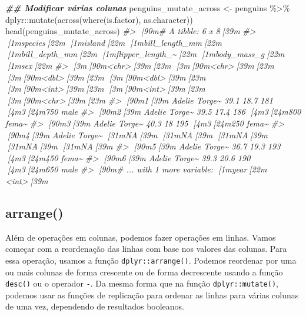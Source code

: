 \documentclass[
]{book}
\newenvironment{Shaded}{\begin{snugshade}}{\end{snugshade}}
\newcommand{\CommentTok}[1]{\textcolor[rgb]{0.37,0.37,0.37}{\textit{#1}}}
\newcommand{\DocumentationTok}[1]{\textcolor[rgb]{0.37,0.37,0.37}{\textbf{\textit{#1}}}}
\newcommand{\FunctionTok}[1]{\textcolor[rgb]{0,0,0}{#1}}
\newcommand{\NormalTok}[1]{#1}
\newcommand{\OtherTok}[1]{\textcolor[rgb]{0.37,0.37,0.37}{#1}}
\newcommand{\SpecialCharTok}[1]{\textcolor[rgb]{0,0,0}{#1}}
\begin{document}
\begin{Shaded}
\begin{Highlighting}[]
\DocumentationTok{\#\# Modificar várias colunas}
\NormalTok{penguins\_mutate\_across }\OtherTok{\textless{}{-}}\NormalTok{ penguins }\SpecialCharTok{\%\textgreater{}\%} 
\NormalTok{  dplyr}\SpecialCharTok{::}\FunctionTok{mutate}\NormalTok{(}\FunctionTok{across}\NormalTok{(}\FunctionTok{where}\NormalTok{(is.factor), as.character))}
\FunctionTok{head}\NormalTok{(penguins\_mutate\_across)}
\CommentTok{\#\textgreater{} [90m\# A tibble: 6 x 8[39m}
\CommentTok{\#\textgreater{}   [1mspecies[22m [1misland[22m [1mbill\_length\_mm[22m [1mbill\_depth\_mm[22m [1mflipper\_length\_\textasciitilde{}[22m [1mbody\_mass\_g[22m [1msex[22m  }
\CommentTok{\#\textgreater{}   [3m[90m\textless{}chr\textgreater{}[39m[23m   [3m[90m\textless{}chr\textgreater{}[39m[23m           [3m[90m\textless{}dbl\textgreater{}[39m[23m         [3m[90m\textless{}dbl\textgreater{}[39m[23m            [3m[90m\textless{}int\textgreater{}[39m[23m       [3m[90m\textless{}int\textgreater{}[39m[23m [3m[90m\textless{}chr\textgreater{}[39m[23m}
\CommentTok{\#\textgreater{} [90m1[39m Adelie  Torge\textasciitilde{}           39.1          18.7              181        [4m3[24m750 male }
\CommentTok{\#\textgreater{} [90m2[39m Adelie  Torge\textasciitilde{}           39.5          17.4              186        [4m3[24m800 fema\textasciitilde{}}
\CommentTok{\#\textgreater{} [90m3[39m Adelie  Torge\textasciitilde{}           40.3          18                195        [4m3[24m250 fema\textasciitilde{}}
\CommentTok{\#\textgreater{} [90m4[39m Adelie  Torge\textasciitilde{}           [31mNA[39m            [31mNA[39m                 [31mNA[39m          [31mNA[39m [31mNA[39m   }
\CommentTok{\#\textgreater{} [90m5[39m Adelie  Torge\textasciitilde{}           36.7          19.3              193        [4m3[24m450 fema\textasciitilde{}}
\CommentTok{\#\textgreater{} [90m6[39m Adelie  Torge\textasciitilde{}           39.3          20.6              190        [4m3[24m650 male }
\CommentTok{\#\textgreater{} [90m\# ... with 1 more variable: [1myear[22m \textless{}int\textgreater{}[39m}
\end{Highlighting}
\end{Shaded}

\hypertarget{arrange}{%
\subsection{arrange()}\label{arrange}}

Além de operações em colunas, podemos fazer operações em linhas. Vamos começar com a reordenação das linhas com base nos valores das colunas. Para essa operação, usamos a função \texttt{dplyr::arrange()}. Podemos reordenar por uma ou mais colunas de forma crescente ou de forma decrescente usando a função \texttt{desc()} ou o operador \texttt{-}. Da mesma forma que na função \texttt{dplyr::mutate()}, podemos usar as funções de replicação para ordenar as linhas para várias colunas de uma vez, dependendo de resultados booleanos.
\end{document}
